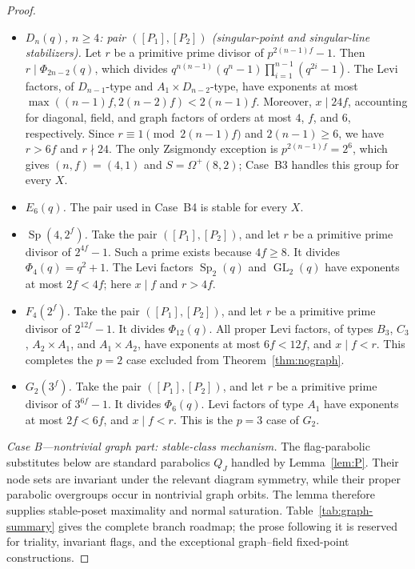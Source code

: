 \documentclass[11pt]{amsart}
\theoremstyle{definition}
\theoremstyle{remark}
\DeclareMathOperator{\Sp}{Sp}
\DeclareMathOperator{\GL}{GL}
\begin{document}
\begin{proof}
\begin{itemize}
\item \emph{$D_n(q)$, $n\geq4$: pair $([P_1],[P_2])$ (singular-point and
singular-line stabilizers).} Let $r$ be a primitive prime divisor of
$p^{2(n-1)f}-1$. Then $r\mid\Phi_{2n-2}(q)$, which divides
$q^{n(n-1)}(q^n-1)\prod_{i=1}^{n-1}(q^{2i}-1)$. The Levi factors, of
$D_{n-1}$-type and $A_1{\times}D_{n-2}$-type, have exponents at most
$\max((n-1)f,2(n-2)f)<2(n-1)f$. Moreover, $x\mid24f$, accounting for
diagonal, field, and graph factors of orders at most $4$, $f$, and $6$,
respectively. Since $r\equiv1\pmod{2(n-1)f}$ and $2(n-1)\geq6$, we
have $r>6f$ and $r\nmid24$. The only Zsigmondy exception is
$p^{2(n-1)f}=2^6$, which gives $(n,f)=(4,1)$ and
$S=\Omega^+(8,2)$; Case~B3 handles this group for every $X$.

\item \emph{$E_6(q)$.} The pair used in Case~B4 is stable for every $X$.

\item \emph{$\Sp(4,2^f)$.} Take the pair $([P_1],[P_2])$, and let $r$
be a primitive prime divisor of $2^{4f}-1$. Such a prime exists because
$4f\geq8$. It divides
$\Phi_4(q)=q^2+1$. The Levi factors $\Sp_2(q)$ and $\GL_2(q)$ have
exponents at most $2f<4f$; here $x\mid f$ and $r>4f$.

\item \emph{$F_4(2^f)$.} Take the pair $([P_1],[P_2])$, and let $r$ be a
primitive prime divisor of $2^{12f}-1$. It divides $\Phi_{12}(q)$. All
proper Levi factors, of types
$B_3$, $C_3$, $A_2{\times}A_1$, and $A_1{\times}A_2$, have exponents
at most $6f<12f$, and $x\mid f<r$. This completes the $p=2$ case
excluded from Theorem~\ref{thm:nograph}.

\item \emph{$G_2(3^f)$.} Take the pair $([P_1],[P_2])$, and let $r$ be a
primitive prime divisor of $3^{6f}-1$. It divides $\Phi_6(q)$. Levi factors
of type $A_1$ have
exponents at most $2f<6f$, and $x\mid f<r$. This is the $p=3$ case of
$G_2$.
\end{itemize}

\emph{Case B---nontrivial graph part: stable-class mechanism.}
The flag-parabolic substitutes below are standard parabolics $Q_J$ handled by
Lemma~\ref{lem:P}. Their node sets are invariant under the relevant diagram
symmetry, while their proper parabolic overgroups occur in nontrivial graph
orbits. The lemma therefore supplies stable-poset maximality and normal
saturation. Table~\ref{tab:graph-summary} gives the complete branch roadmap;
the prose following it is reserved for triality, invariant flags, and the
exceptional graph--field fixed-point constructions.


\end{proof}
\end{document}
